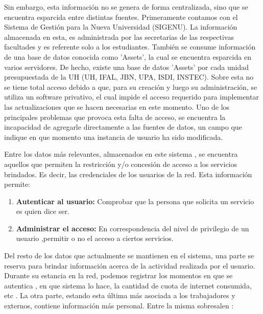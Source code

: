 Sin embargo, esta información no se genera de forma centralizada, sino que se encuentra 
esparcida entre distintas fuentes. Primeramente contamos con el Sistema de Gestión para la 
Nueva Universidad (SIGENU). La información almacenada en esta, es administrada por las 
secretarias de las respectivas facultades y es referente solo a los estudiantes. También se
consume información de una base de datos conocida como 'Assets', la cual se encuentra 
esparcida en varios servidores. De hecho, existe una base de datos 'Assets' por cada unidad
presupuestada de la UH (UH, IFAL, JBN, UPA, ISDI, INSTEC). Sobre esta no se tiene total 
acceso debido a que, para su creación y luego su administración, se utiliza un software 
privativo, el cual impide el acceso requerido para implementar las actualizaciones que se 
hacen necesarias en este momento.  
Uno de los principales problemas que provoca esta falta de acceso, se encuentra la 
incapacidad de agregarle directamente a las fuentes de datos, un campo que indique en que 
momento una instancia de usuario ha sido modificada. 

Entre los datos más relevantes, almacenados en este sistema , se encuentra aquellos que 
permiten la restricción y/o concesión de acceso a los servicios brindados. Es decir, las 
credenciales de los usuarios de la red. Esta información permite:

\begin{enumerate}
\item {\bf Autenticar al usuario:} Comprobar que la persona que solicita un servicio es 
quien dice ser.
\item {\bf Administrar el acceso:} En correspondencia del nivel de privilegio de un usuario 
,permitir o no el acceso a ciertos servicios.
\end{enumerate}

Del resto de los datos que actualmente se mantienen en el sistema, una parte se reserva 
para brindar información acerca de la actividad realizada por el usuario. Durante su 
estancia en la red, podemos registrar los momentos en que se autentica , en que sistema lo 
hace, la cantidad de cuota de internet consumida, etc  . La otra parte, estando esta última 
más asociada a los trabajadores y externos, contiene información más personal. Entre la 
misma sobresalen  : 

